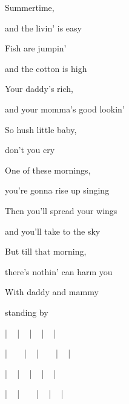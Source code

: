 

\zs
Summertime,    

and the livin' is easy

Fish are jumpin' 

and the cotton is high
 
Your daddy's rich,   

and your momma's good lookin'

So hush little baby, 

don't you cry
\ks

\zs
One of these mornings,  

you're gonna rise up singing

Then you'll spread your wings 

and you'll take to the sky

But till that morning,  

there's nothin' can harm you

With daddy and mammy

standing by
\ks

| ~  |  ~  |  ~  |  ~  | 

| ~ ~ |  ~  |  ~ ~ |  ~  | 

| ~  |  ~  |  ~  |  ~  | 

| ~  |  ~ ~ |  ~  |  ~  | 

\kp
